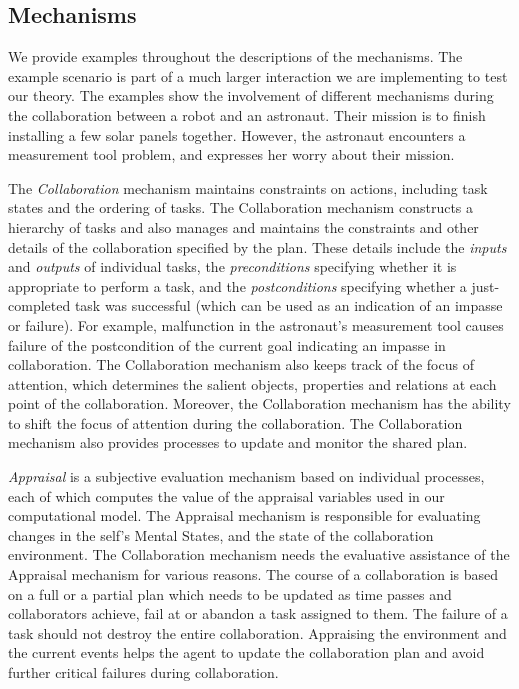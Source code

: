 \documentclass[letterpaper]{article}
\begin{document}
\subsection{Mechanisms}

We provide examples throughout the descriptions of the mechanisms. The example
scenario is part of a much larger interaction we are implementing to test our
theory. The examples show the involvement of different mechanisms during the
collaboration between a robot and an astronaut. Their mission is to finish
installing a few solar panels together. However, the astronaut encounters a
measurement tool problem, and expresses her worry about their mission.

The \textit{Collaboration} mechanism maintains constraints on actions, including
task states and the ordering of tasks. The Collaboration mechanism constructs a
hierarchy of tasks and also manages and maintains the constraints and other
details of the collaboration specified by the plan. These details include the
\textit{inputs} and \textit{outputs} of individual tasks, the
\textit{preconditions} specifying whether it is appropriate to perform a task,
and the \textit{postconditions} specifying whether a just-completed task was
successful (which can be used as an indication of an impasse or failure). For
example, malfunction in the astronaut's measurement tool causes failure of the
postcondition of the current goal indicating an impasse in collaboration.
The Collaboration mechanism also keeps track of the focus of attention, which
determines the salient objects, properties and relations at each point of the
collaboration. Moreover, the Collaboration mechanism has the ability to shift
the focus of attention during the collaboration. The Collaboration mechanism
also provides processes to update and monitor the shared plan.
  
\textit{Appraisal} is a subjective evaluation mechanism based on individual
processes, each of which computes the value of the appraisal variables used in
our computational model. The Appraisal mechanism is responsible for evaluating
changes in the self's Mental States, and the state of the collaboration
environment. The Collaboration mechanism needs the evaluative assistance of the
Appraisal mechanism for various reasons. The course of a collaboration is based
on a full or a partial plan which needs to be updated as time passes and
collaborators achieve, fail at or abandon a task assigned to them. The failure
of a task should not destroy the entire collaboration. Appraising the
environment and the current events helps the agent to update the collaboration
plan and avoid further critical failures during collaboration. 
\end{document}
